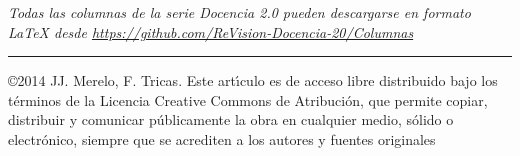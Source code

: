 \documentclass[twoside,10pt]{article}
\begin{document}
\begin{multicols}{2}
\bigskip

\noindent\emph{Todas las columnas de la serie Docencia 2.0
pueden descargarse en formato LaTeX desde
{\small\url{https://github.com/ReVision-Docencia-20/Columnas}}}

\noindent\rule{90mm}{1pt}

{\small \noindent\copyright 2014 JJ. Merelo, F. Tricas. Este art\'{\i}culo es de acceso libre distribuido bajo los t\'erminos
de la Licencia Creative Commons de Atribuci\'on, que permite copiar,
distribuir y comunicar p\'ublicamente la obra en cualquier medio, s\'olido
o electr\'onico, siempre que se acrediten a los autores y fuentes
originales}

\end{multicols}
\end{document}
